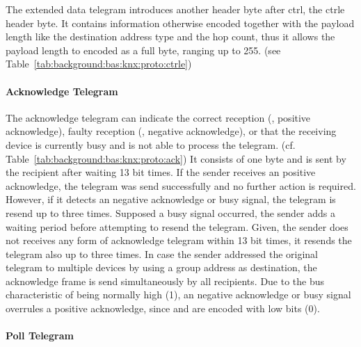 The extended data telegram introduces another header byte after \gls{ctrl}, the \gls{ctrle} header byte. It contains information otherwise encoded together with the payload length like the destination address type and the hop count, thus it allows the payload length to encoded as a full byte, ranging up to 255. (see Table~\ref{tab:background:bas:knx:proto:ctrle})





\paragraph{Acknowledge Telegram}
\label{sec:background:bas:knx:proto:ack}

The acknowledge telegram can indicate the correct reception (, positive acknowledge), faulty reception (, negative acknowledge), or that the receiving device is currently busy and is not able to process the telegram. (cf. Table~\ref{tab:background:bas:knx:proto:ack})
It consists of one byte and is sent by the recipient after waiting 13 bit times.
If the sender receives an positive acknowledge, the telegram was send successfully and no further action is required. However, if it detects an negative acknowledge or busy signal, the telegram is resend up to three times.
Supposed a busy signal occurred, the sender adds a waiting period before attempting to resend the telegram.
Given, the sender does not receives any form of acknowledge telegram within 13 bit times, it resends the telegram also up to three times.
In case the sender addressed the original telegram to multiple devices by using a group address as destination, the acknowledge frame is send simultaneously by all recipients. Due to the bus characteristic of being normally high (1), an negative acknowledge or busy signal overrules a positive acknowledge, since  and  are encoded with low bits (0). \parencite{Merz2009,Sokollik2017}



\paragraph{Poll Telegram}
\label{sec:background:bas:knx:proto:poll}

